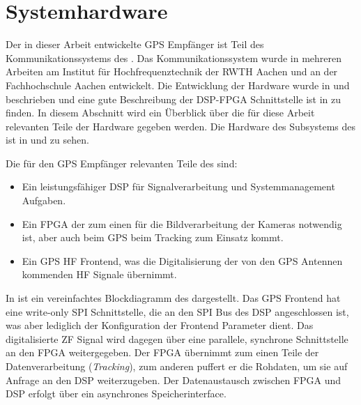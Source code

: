 \section{Systemhardware}
Der in dieser Arbeit entwickelte GPS Empfänger ist Teil des Kommunikationssystems des \dscubesat. Das Kommunikationssystem wurde in mehreren Arbeiten am Institut für Hochfrequenztechnik der RWTH Aachen und an der Fachhochschule Aachen entwickelt. Die Entwicklung der \comboard Hardware wurde in \cite{DragsailKaiMA} und \cite{DragsailMattiMA} beschrieben und eine gute Beschreibung der DSP-FPGA Schnittstelle ist in \cite{DragsailAndrejMA} zu finden.
In diesem Abschnitt wird ein Überblick über die für diese Arbeit relevanten Teile der \comboard Hardware gegeben werden. Die Hardware des \comboard Subsystems des \dscubesat ist in  und  zu sehen. 

Die für den GPS Empfänger relevanten Teile des \comboard sind: 
\begin{itemize}
\item Ein leistungsfähiger \gls{DSP} für Signalverarbeitung und Systemmanagement Aufgaben.
\item Ein \gls{FPGA} der zum einen für die Bildverarbeitung der Kameras notwendig ist, aber auch beim GPS beim Tracking zum Einsatz kommt.
\item Ein GPS HF Frontend, was die Digitalisierung der von den GPS Antennen kommenden HF Signale übernimmt.
\end{itemize}



In  ist ein vereinfachtes Blockdiagramm des \comboard dargestellt. Das GPS Frontend hat eine write-only SPI Schnittstelle, die an den SPI Bus des DSP angeschlossen ist, was aber lediglich der Konfiguration der Frontend Parameter dient. Das digitalisierte \gls{ZF} Signal wird dagegen über eine parallele, synchrone Schnittstelle an den FPGA weitergegeben. Der FPGA übernimmt zum einen Teile der Datenverarbeitung (\emph{Tracking}), zum anderen puffert er die Rohdaten, um sie auf Anfrage an den DSP weiterzugeben. Der Datenaustausch zwischen FPGA und DSP erfolgt über ein asynchrones Speicherinterface. 


